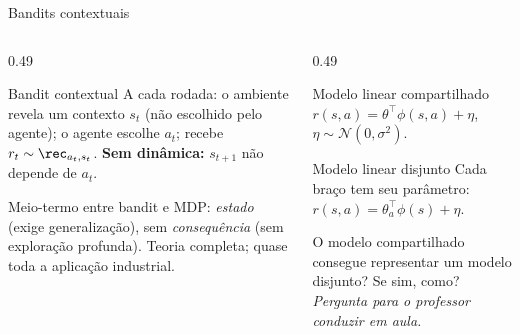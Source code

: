 \documentclass[aspectratio=169, 11pt]{beamer}
\newcommand{\paradiscussao}{\smallskip
  {\footnotesize\color{rlCinza}\itshape Pergunta para o professor conduzir em aula.}}
\newcommand{\feat}{\phi}
\begin{document}
\begin{frame}{Bandits contextuais}
  \begin{columns}[T]
    \begin{column}{0.49\textwidth}
      \begin{defbox}{Bandit contextual}
        A cada rodada: o ambiente revela um contexto $s_t$ (não escolhido pelo agente);
        o agente escolhe $a_t$; recebe $r_t \sim \rec_{a_t,s_t}$.
        \textbf{Sem dinâmica:} $s_{t+1}$ não depende de $a_t$.
      \end{defbox}
      \begin{ideiabox}
        Meio-termo entre bandit e MDP: \emph{estado} (exige generalização), sem
        \emph{consequência} (sem exploração profunda). Teoria completa; quase toda a
        aplicação industrial.
      \end{ideiabox}
    \end{column}
    \begin{column}{0.49\textwidth}
      \begin{teobox}{Modelo linear compartilhado}
        $r(s,a) = \theta^{\!\top} \feat(s,a) + \eta$, \; $\eta \sim \mathcal{N}(0,\sigma^{2})$.
      \end{teobox}
      \begin{teobox}{Modelo linear disjunto}
        Cada braço tem seu parâmetro: $r(s,a) = \theta_a^{\!\top} \feat(s) + \eta$.
      \end{teobox}
      \begin{quizbox}{}
        O modelo compartilhado consegue representar um modelo disjunto? Se sim, como?
        \paradiscussao
      \end{quizbox}
    \end{column}
  \end{columns}
\end{frame}
\end{document}
